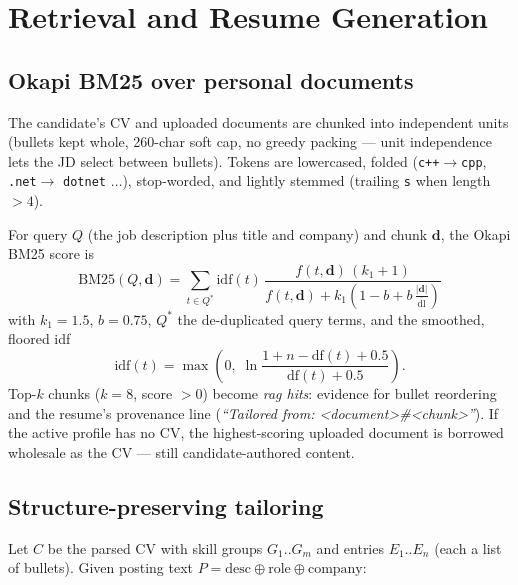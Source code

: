\documentclass[11pt,a4paper]{article}
\newcommand{\code}[1]{\texttt{#1}}
\newcommand{\vect}[1]{\mathbf{#1}}
\begin{document}
\section{Retrieval and Resume Generation}
\label{sec:resume}

\subsection{Okapi BM25 over personal documents}
\label{sec:bm25}

The candidate's CV and uploaded documents are chunked into independent
units (bullets kept whole, 260-char soft cap, no greedy packing --- unit
independence lets the JD select between bullets). Tokens are lowercased,
folded (\code{c++}$\rightarrow$\code{cpp}, \code{.net}$\rightarrow$
\code{dotnet} $\ldots$), stop-worded, and lightly stemmed (trailing
\code{s} when length $> 4$).

For query $Q$ (the job description plus title and company) and chunk
$\vect{d}$, the Okapi BM25 score is
\begin{equation}
\text{BM25}(Q,\vect{d}) = \sum_{t \in Q^{*}}
  \text{idf}(t)\,
  \frac{f(t,\vect{d})\,(k_1+1)}
       {f(t,\vect{d}) + k_1\!\left(1-b+b\,\frac{|\vect{d}|}{\overline{\text{dl}}}\right)}
\end{equation}
with $k_1 = 1.5$, $b = 0.75$, $Q^{*}$ the de-duplicated query terms, and
the smoothed, floored idf
\begin{equation}
\text{idf}(t) = \max\!\left(0,\;
  \ln\frac{1 + n - \text{df}(t) + 0.5}{\text{df}(t) + 0.5}\right).
\end{equation}
Top-$k$ chunks ($k=8$, score $> 0$) become \emph{rag hits}: evidence for
bullet reordering and the resume's provenance line
(\emph{``Tailored from: <document>\#<chunk>''}). If the active profile has
no CV, the highest-scoring uploaded document is borrowed wholesale as the
CV --- still candidate-authored content.

\subsection{Structure-preserving tailoring}
\label{sec:tailoring}

Let $C$ be the parsed CV with skill groups $G_1..G_m$ and entries
$E_1..E_n$ (each a list of bullets). Given posting text
$P = \text{desc} \oplus \text{role} \oplus \text{company}$:
\end{document}
